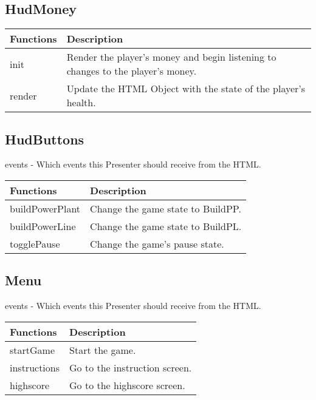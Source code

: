 \subsection*{HudMoney}
	\begin{table}[H]
	\begin{tabular}{p{4cm} | p{8cm} }
	\hline
	\rowcolor{gray}
	Functions & Description \\ \hline
	init & Render the player's money and begin listening to changes to the player's money. \\ \hline
	render & Update the HTML Object with the state of the player's health. \\ \hline
	\end{tabular}
	\end{table}

\subsection*{HudButtons}

	events - Which events this Presenter should receive from the HTML.

	\begin{table}[H]
	\begin{tabular}{p{4cm} | p{8cm} }
	\hline
	\rowcolor{gray}
	Functions & Description \\ \hline
	buildPowerPlant & Change the game state to BuildPP. \\ \hline
	buildPowerLine & Change the game state to BuildPL. \\ \hline
	togglePause & Change the game's pause state. \\ \hline
	\end{tabular}
	\end{table}

\subsection*{Menu}

	events - Which events this Presenter should receive from the HTML.

	\begin{table}[H]
	\begin{tabular}{p{4cm} | p{8cm} }
	\hline
	\rowcolor{gray}
	Functions & Description \\ \hline
	startGame & Start the game. \\ \hline
	instructions & Go to the instruction screen. \\ \hline
	highscore & Go to the highscore screen. \\ \hline
	\end{tabular}
	\end{table}

